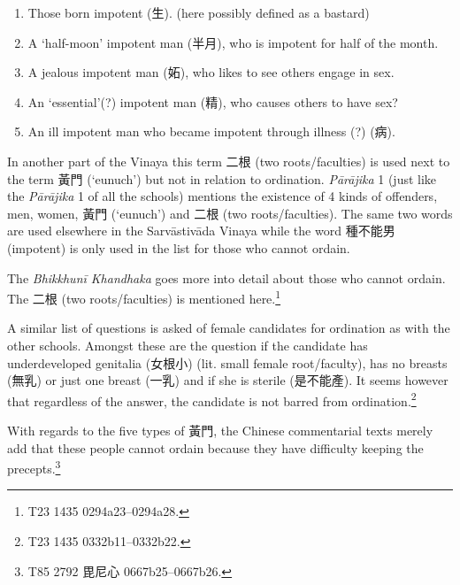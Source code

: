 \begin{enumerate}
\item Those born impotent (生). (here possibly defined as a bastard)
\item A `half-moon' impotent man (半月), who is impotent for half of the month.
\item A jealous impotent man (妬), who likes to see others engage in sex.
\item An `essential'(?) impotent man (精), who causes others to have sex?
\item An ill impotent man who became impotent through illness (?) (病).
\end{enumerate}

In another part of the Vinaya this term 二根 (two roots/faculties) is used next to the term 黃門 (`eunuch') but not in relation to ordination. {\em Pārājika} 1 (just like the {\em Pārājika} 1 of all the schools) mentions the existence of 4 kinds of offenders, men, women, 黃門 (`eunuch') and 二根 (two roots/faculties). The same two words are used elsewhere in the Sarvāstivāda Vinaya while the word 種不能男 (impotent) is only used in the list for those who cannot ordain.

The {\em Bhikkhunī Khandhaka} goes more into detail about those who cannot ordain. The 二根 (two roots/faculties) is mentioned here.\footnote{T23 1435 0294a23–0294a28.} 

A similar list of questions is asked of female candidates for ordination as with the other schools. Amongst these are the question if the candidate has underdeveloped genitalia (女根小) (lit. small female root/faculty), has no breasts (無乳) or just one breast (一乳) and if she is sterile (是不能產). It seems however that regardless of the answer, the candidate is not barred from ordination.\footnote{T23 1435 0332b11–0332b22.}

With regards to the five types of 黃門, the Chinese commentarial texts merely add that these people cannot ordain because they have difficulty keeping the precepts.\footnote{T85 2792 毘尼心 0667b25–0667b26.}
